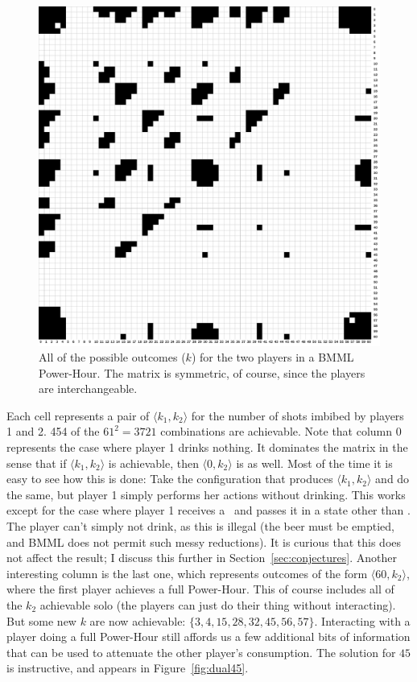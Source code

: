\documentclass[twocolumn]{article}
\begin{document}
\begin{figure}[ht]
\begin{center}
\includegraphics[width=0.90 \linewidth]{powerhour2player.pdf}
\end{center}\vspace{-0.1in}
\caption{All of the possible outcomes ($k$) for the two players in a
  BMML Power-Hour. The matrix is symmetric, of course, since the players
  are interchangeable.}
\label{fig:powerhour2player}
\end{figure}

Each cell represents a pair of $\langle k_1, k_2 \rangle$ for the
number of shots imbibed by players 1 and 2. 454 of the $61^2 = 3721$
combinations are achievable. Note that column 0 represents the case
where player 1 drinks nothing. It dominates the matrix in the sense
that if $\langle k_1, k_2 \rangle$ is achievable, then $\langle 0, k_2
\rangle$ is as well. Most of the time it is easy to see how this is
done: Take the configuration that produces $\langle k_1, k_2 \rangle$
and do the same, but player 1 simply performs her actions without
drinking. This works except for the case where player 1 receives a
\fullcup\ and passes it in a state other than \fullcup. The player
can't simply not drink, as this is illegal (the beer must be emptied,
and BMML does not permit such messy reductions). It is curious that
this does not affect the result; I discuss this further in
Section~\ref{sec:conjectures}. Another interesting column is the last
one, which represents outcomes of the form $\langle 60, k_2 \rangle$,
where the first player achieves a full Power-Hour. This of course
includes all of the $k_2$ achievable solo (the players can just do
their thing without interacting). But some new $k$ are now achievable:
$\{ 3, 4, 15, 28, 32, 45, 56, 57 \}$. Interacting with a player doing
a full Power-Hour still affords us a few additional bits of
information that can be used to attenuate the other player's
consumption. The solution for $45$ is instructive, and appears in
Figure~\ref{fig:dual45}.
\end{document}
